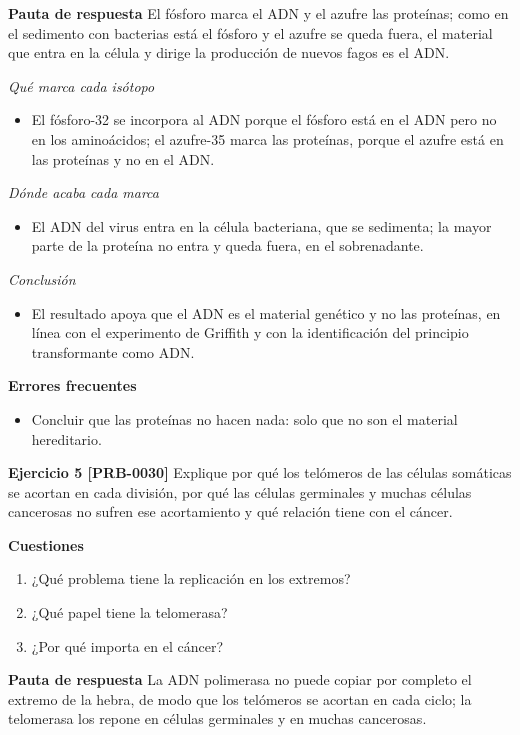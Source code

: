 \documentclass{book}
\begin{document}
\noindent\textbf{Pauta de respuesta}
El fósforo marca el ADN y el azufre las proteínas; como en el sedimento con bacterias está el fósforo y el azufre se queda fuera, el material que entra en la célula y dirige la producción de nuevos fagos es el ADN.


\noindent\textit{Qué marca cada isótopo}
\begin{itemize}
\item El fósforo-32 se incorpora al ADN porque el fósforo está en el ADN pero no en los aminoácidos; el azufre-35 marca las proteínas, porque el azufre está en las proteínas y no en el ADN.
\end{itemize}

\noindent\textit{Dónde acaba cada marca}
\begin{itemize}
\item El ADN del virus entra en la célula bacteriana, que se sedimenta; la mayor parte de la proteína no entra y queda fuera, en el sobrenadante.
\end{itemize}

\noindent\textit{Conclusión}
\begin{itemize}
\item El resultado apoya que el ADN es el material genético y no las proteínas, en línea con el experimento de Griffith y con la identificación del principio transformante como ADN.
\end{itemize}

\noindent\textbf{Errores frecuentes}
\begin{itemize}
\item Concluir que las proteínas no hacen nada: solo que no son el material hereditario.
\end{itemize}

\noindent\textbf{Ejercicio 5 [PRB-0030]}
Explique por qué los telómeros de las células somáticas se acortan en cada división, por qué las células germinales y muchas células cancerosas no sufren ese acortamiento y qué relación tiene con el cáncer.


\noindent\textbf{Cuestiones}
\begin{enumerate}
\item ¿Qué problema tiene la replicación en los extremos?
\item ¿Qué papel tiene la telomerasa?
\item ¿Por qué importa en el cáncer?
\end{enumerate}

\noindent\textbf{Pauta de respuesta}
La ADN polimerasa no puede copiar por completo el extremo de la hebra, de modo que los telómeros se acortan en cada ciclo; la telomerasa los repone en células germinales y en muchas cancerosas.
\end{document}
